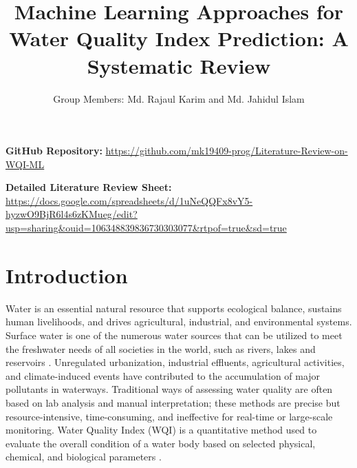 \documentclass[conference]{IEEEtran}
\begin{document}
\title{Machine Learning Approaches for Water Quality Index Prediction: A Systematic Review}

\author{Group Members: Md. Rajaul Karim and Md. Jahidul Islam }

\maketitle





\noindent\textbf{GitHub Repository:} 
\color{blue}\url{https://github.com/mk19409-prog/Literature-Review-on-WQI-ML}\color{black}


\noindent\textbf{Detailed Literature Review Sheet:} 
\color{blue}\url{https://docs.google.com/spreadsheets/d/1uNeQQFx8vY5-hyzwO9BjR6l4s6zKMueg/edit?usp=sharing&ouid=106348839836730303077&rtpof=true&sd=true}\color{black}



\section{Introduction}

Water is an essential natural resource that supports ecological balance, sustains human livelihoods, and drives agricultural, industrial, and environmental systems. Surface water is one of the numerous water sources that can be utilized to meet the freshwater needs of all societies in the world, such as rivers, lakes and reservoirs \cite{uddin2021review}. Unregulated urbanization, industrial effluents, agricultural activities, and climate-induced events have contributed to the accumulation of major pollutants in waterways. Traditional ways of assessing water quality are often based on lab analysis and manual interpretation; these methods are precise but resource-intensive, time-consuming, and ineffective for real-time or large-scale monitoring. Water Quality Index (WQI) is a quantitative method used to evaluate the overall condition of a water body based on selected physical, chemical, and biological parameters \cite{syeed2023surface}.
\end{document}
